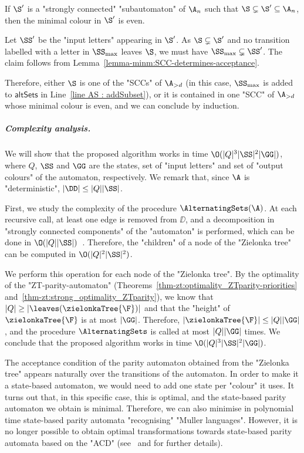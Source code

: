 \documentclass{theoretics}
\begin{document}
\begin{claim}
	If $\S'$ is a "strongly connected" "subautomaton" of $\A_n$ such that $\S\subsetneq \S' \subseteq \A_n$, then the minimal colour in $\S'$ is even.
\end{claim}
\begin{subproof}
	Let $\SS'$ be the "input letters" appearing in $\S'$.
	As $\S\subsetneq \S'$ and no transition labelled with a letter in $\SS_{\max}$ leaves $\S$, we must have $\SS_{\max}\subsetneq \SS'$. The claim follows from Lemma~\ref{lemma-minm:SCC-determines-acceptance}.
\end{subproof}

Therefore, either $\S$ is one of the "SCCs" of $\A_{>d}$ (in this case, $\SS_{\max}$ is added to $\mathsf{altSets}$ in Line~\ref{line AS : addSubset}), or it is contained in one "SCC" of $\A_{>d}$ whose minimal colour is even, and we can conclude by induction.


\subparagraph{Complexity analysis.}
We will show that the proposed algorithm works in time $\O(|Q|^3|\SS|^2|\GG|)$, where $Q$, $\SS$ and $\GG$ are the states, set of "input letters" and set of "output colours" of the automaton, respectively.
We remark that, since $\A$ is "deterministic", $|\DD|\leq |Q||\SS|$.

First, we study the complexity of the procedure $\AlternatingSets(\A)$. At each recursive call, at least one edge is removed from $\DD$, and a decomposition in "strongly connected components" of the "automaton" is performed, which can be done in $\O(|Q||\SS|)$~\cite{Tarjan72DepthFirst}. Therefore, the "children" of a node of the "Zielonka tree" can be computed in $\O(|Q|^2|\SS|^2)$.

We perform this operation for each node of the "Zielonka tree". By the optimality of the "ZT-parity-automaton" (Theorems~\ref{thm-zt:optimality_ZTparity-priorities} and~\ref{thm-zt:strong_optimality_ZTparity}), we know that $|Q| \geq |\leaves(\zielonkaTree{\F})|$ and that the "height" of $\zielonkaTree{\F}$ is at most $|\GG|$. Therefore, $|\zielonkaTree{\F}| \leq |Q||\GG|$, and the procedure $\AlternatingSets$ is called at most $|Q||\GG|$ times. We conclude that the proposed algorithm works in time $\O(|Q|^3|\SS|^2|\GG|)$.



\begin{remark}
    The acceptance condition of the parity automaton obtained from the "Zielonka tree" appears naturally over the transitions of the automaton. In order to make it a state-based automaton, we would need to add one state per "colour" it uses. It turns out that, in this specific case, this is optimal, and the state-based parity automaton we obtain is minimal. Therefore, we can also minimise in polynomial time state-based parity automata "recognising" "Muller languages".
    However, it is no longer possible to obtain optimal transformations towards state-based parity automata based on the "ACD" (see~\cite[Section~5.3]{CDMRS22Tacas} and \cite[Section~I.8]{Casares23Thesis} for further details).
\end{remark}
\end{document}
